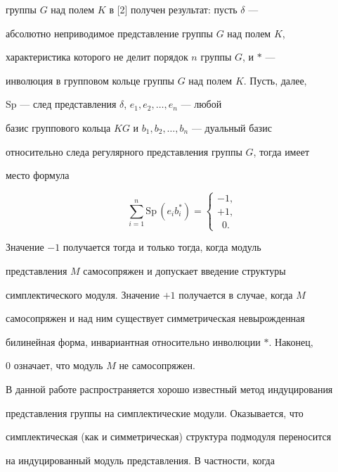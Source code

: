 группы $G$ над полем $K$ в [2] получен результат: пусть $\delta$ ---


абсолютно неприводимое представление группы $G$ над полем $K$,


характеристика которого не делит порядок $n$ группы $G$, и $*$ ---


инволюция в групповом кольце группы $G$ над полем $K$. Пусть, далее,


$\text{Sp}$ --- след представления $\delta$, $e_1,e_2,\dotsc,e_n$ --- любой


базис группового кольца $KG$ и $b_1,b_2,\dotsc,b_n$ --- дуальный базис


относительно следа регулярного представления группы $G$, тогда имеет


место формула


\begin{equation}


\sum^n_{i=1}\text{Sp}\,(e_ib^*_i)=


\begin{cases}


-1,\\


+1,\\


{\phantom{1}}0.


\end{cases}


\end{equation}


Значение $-1$ получается тогда и только тогда, когда модуль


представления $M$ самосопряжен и допускает введение структуры


симплектического модуля. Значение $+1$ получается в случае, когда $M$


самосопряжен и над ним существует симметрическая невырожденная


билинейная форма, инвариантная относительно инволюции $*$. Наконец,


$0$ означает, что модуль $M$ не самосопряжен.





В данной работе распространяется хорошо известный метод индуцирования


представления группы на симплектические модули. Оказывается, что


симплектическая (как и симметрическая) структура подмодуля переносится


на индуцированный модуль представления. В частности, когда


